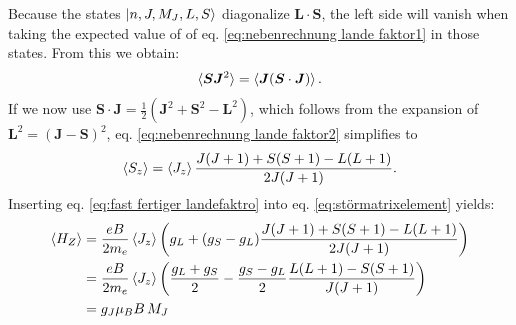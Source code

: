 Because the states $\ket{n,J,M_J,L,S}$ diagonalize $\bm L \cdot \bm S$, the left side  will  vanish when taking the expected value of of eq. \eqref{eq:nebenrechnung lande faktor1} in those states. From this we obtain:
\begin{align}
	\braket{\bm S \bm J^2}=\braket{\bm J(\bm S \cdot \bm J)}\label{eq:nebenrechnung lande faktor2}.
\end{align}
If we now use $\bm S \cdot \bm J=\frac{1}{2}(\bm J^2+\bm S^2-\bm L^2)$, which follows from the expansion of $\bm L^2=(\bm J -\bm S)^2$, eq. \eqref{eq:nebenrechnung lande faktor2} simplifies to
\begin{align}
	\braket{S_z}=\braket{J_z}\frac{J(J+1)+S(S+1)-L(L+1)}{2J(J+1)}. \label{eq:fast fertiger landefaktro}
\end{align}
Inserting eq. \eqref{eq:fast fertiger landefaktro} into eq. \eqref{eq:störmatrixelement} yields:
\begin{align}
	\braket{H_Z}&=\frac{eB}{2m_e}\braket{J_z}\left(g_L+(g_S-g_L)\frac{J(J+1)+S(S+1)-L(L+1)}{2J(J+1)}\right)\nonumber\\
	&=\frac{eB}{2m_e}\braket{J_z}\left(\frac{g_L+g_S}{2}-\frac{g_S-g_L}{2}\frac{L(L+1)-S(S+1)}{J(J+1)}\right)\nonumber\\
	&=g_J\mu_B B \,  M_J \label{eq:energieshift}
\end{align}
\cite[Chap.~14.2]{schwablQM}
